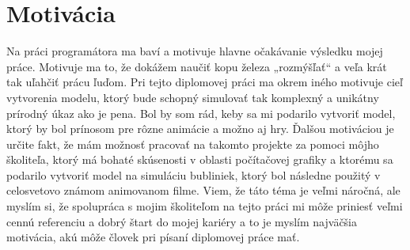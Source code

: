 \chapter{Motivácia}\label{chap:motivation}

Na práci programátora ma baví a motivuje hlavne očakávanie výsledku mojej práce. Motivuje ma to, že dokážem naučiť kopu železa „rozmýšľať“ a veľa krát tak uľahčiť prácu ľuďom. Pri tejto diplomovej práci ma okrem iného motivuje cieľ vytvorenia modelu, ktorý bude schopný simulovať tak komplexný a unikátny prírodný úkaz ako je pena. Bol by som rád, keby sa mi podarilo vytvoriť model, ktorý by bol prínosom pre rôzne animácie a možno aj hry. Ďalšou motiváciou je určite fakt, že mám možnosť pracovať na takomto projekte za pomoci môjho školiteľa, ktorý má bohaté skúsenosti v oblasti počítačovej grafiky a ktorému sa podarilo vytvoriť model na simuláciu bubliniek, ktorý bol následne použitý v celosvetovo známom animovanom filme. Viem, že táto téma je veľmi náročná, ale myslím si, že spolupráca s mojim školiteľom na tejto práci mi môže priniesť veľmi cennú referenciu a dobrý štart do mojej kariéry a to je myslím najväčšia motivácia, akú môže človek pri písaní diplomovej práce mať.